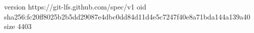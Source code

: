 version https://git-lfs.github.com/spec/v1
oid sha256:fc20ff8025b2b5dd29087e4dbc0dd84d11d4e5c7247f40e8a71bda144a139a40
size 4403
